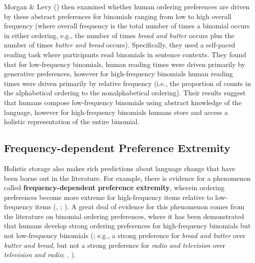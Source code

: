 \documentclass[
  12pt,
]{scrartcl}
\begin{document}
Morgan \& Levy ()
then examined whether human ordering preferences are driven by these
abstract preferences for binomials ranging from low to high overall
frequency (where overall frequency is the total number of times a
binomial occurs in either ordering, e.g., the number of times
\emph{bread and butter} occurs plus the number of times \emph{butter and
bread} occurs). Specifically, they used a self-paced reading task where
participants read binomials in sentence contexts. They found that for
low-frequency binomials, human reading times were driven primarily by
generative preferences, however for high-frequency binomials human
reading times were driven primarily by relative frequency (i.e., the
proportion of counts in the alphabetical ordering to the nonalphabetical
ordering). Their results suggest that humans compose low-frequency
binomials using abstract knowledge of the language, however for
high-frequency binomials humans store and access a holistic
representation of the entire binomial.

\subsection{Frequency-dependent Preference
Extremity}\label{frequency-dependent-preference-extremity}

Holistic storage also makes rich predictions about language change that
have been borne out in the literature. For example, there is evidence
for a phenomenon called \textbf{frequency-dependent preference
extremity}, wherein ordering preferences become more extreme for
high-frequency items relative to low-frequency items
(,
;
). A great deal of evidence for this phenomenon comes from the
literature on binomial ordering preferences, where it has been
demonstrated that humans develop strong ordering preferences for
high-frequency binomials but not low-frequency binomials
(; e.g., a strong preference for \emph{bread and butter} over
\emph{butter and bread}, but not a strong preference for \emph{radio and
television} over \emph{television and radio};
,
).
\end{document}
